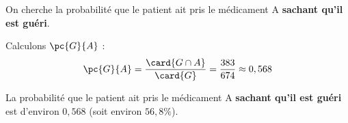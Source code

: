 \begin{ex}
	On cherche la probabilité que le patient ait pris le médicament A \textbf{sachant qu'il est guéri}.

	Calculons $\pc{G}{A}$ :
	\[
		\pc{G}{A} = \dfrac{\card{G \cap A}}{\card{G}} = \dfrac{383}{674} \approx 0,568
	\]

	La probabilité que le patient ait pris le médicament A \textbf{sachant qu'il est guéri} est d'environ $0,568$ (soit environ $56,8\%$).
\end{ex}


